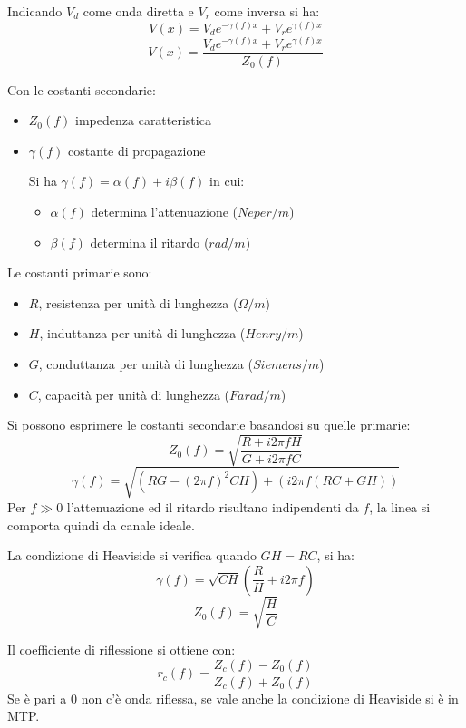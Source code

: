 \documentclass{article}
\begin{document}
\noindent Indicando $V_d$ come onda diretta e $V_r$ come inversa si ha:
$$V(x)=V_de^{-\gamma(f)x}+V_re^{\gamma(f)x}$$
$$V(x)=\frac{V_de^{-\gamma(f)x}+V_re^{\gamma(f)x}}{Z_0(f)}$$

\newpage

\noindent Con le costanti secondarie:
\begin{itemize}
    \item $Z_0(f)$ impedenza caratteristica
    \item $\gamma(f)$ costante di propagazione

        Si ha $\gamma(f)=\alpha(f)+i\beta(f)$ in cui:
            \begin{itemize}
                \item $\alpha(f)$ determina l'attenuazione ($Neper/m$)
                \item $\beta(f)$ determina il ritardo ($rad/m$)\newline
            \end{itemize}
    
\end{itemize}

\noindent Le costanti primarie sono:
\begin{itemize}
    \item $R$, resistenza per unità di lunghezza ($\Omega/m$)
    \item $H$, induttanza per unità di lunghezza ($Henry/m$)
    \item $G$, conduttanza per unità di lunghezza ($Siemens/m$)
    \item $C$, capacità per unità di lunghezza ($Farad/m$)\newline
\end{itemize}

\noindent Si possono esprimere le costanti secondarie basandosi su quelle primarie:
$$Z_0(f)=\sqrt{\frac{R+i2\pi fH}{G+i2\pi fC}}$$
$$\gamma(f)=\sqrt{(RG-(2\pi f)^2CH)+(i2\pi f(RC+GH))}$$
\noindent Per $f\gg 0$ l'attenuazione ed il ritardo risultano indipendenti da $f$, la linea si comporta quindi da canale ideale.\newline

\noindent La condizione di Heaviside si verifica quando $GH=RC$, si ha:
$$\gamma(f)=\sqrt{CH}(\frac{R}{H}+i2\pi f)$$
$$Z_0(f)=\sqrt{\frac{H}{C}}$$\newline

\noindent Il coefficiente di riflessione si ottiene con:
$$r_c(f)=\frac{Z_c(f)-Z_0(f)}{Z_c(f)+Z_0(f)}$$
\noindent Se è pari a 0 non c'è onda riflessa, se vale anche la condizione di Heaviside si è in MTP.\newline
\end{document}
